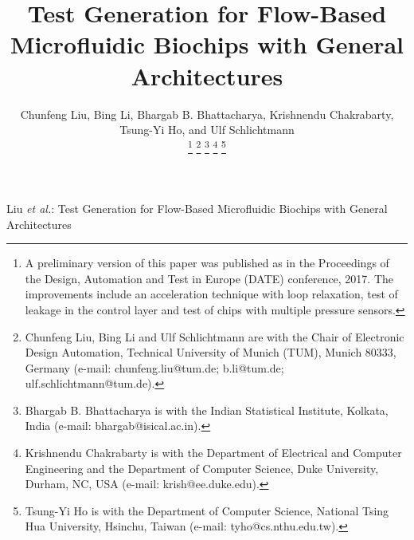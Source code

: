 \documentclass[journal]{IEEEtran}
\begin{document}
\graphicspath{{Fig/}}
\def\figname{Fig.}
\def\algname{Algorithm}
\newcommand{\figurefontsize}{\footnotesize}
\newcommand{\papertitle}{Test Generation for Flow-Based Microfluidic
Biochips with General Architectures}
\newcommand{\tum}{Technical University of Munich (TUM)}




\title{\papertitle}

\author{	
Chunfeng Liu, Bing Li, Bhargab B. Bhattacharya, Krishnendu
Chakrabarty, Tsung-Yi Ho, and Ulf Schlichtmann

\thanks{A preliminary version of this paper was published as \cite{CBBK17} in
the Proceedings of the Design, Automation and Test in Europe (DATE)
conference, 2017. The improvements include an acceleration technique with loop
relaxation, test of leakage in the control layer and test of chips with multiple
pressure sensors.}
          \thanks{Chunfeng Liu, Bing Li and Ulf Schlichtmann are with the Chair
	    of Electronic Design Automation,
          \tum, Munich 80333, Germany (e-mail: chunfeng.liu@tum.de; b.li@tum.de;
  ulf.schlichtmann@tum.de).}
          \thanks{Bhargab B. Bhattacharya is with the Indian Statistical Institute, Kolkata, India
   (e-mail: bhargab@isical.ac.in).}
           \thanks{Krishnendu Chakrabarty is with the Department of 
	     Electrical and Computer Engineering and the Department of Computer
	     Science, Duke University, Durham, NC, USA (e-mail: krish@ee.duke.edu).}
            \thanks{Tsung-Yi Ho is with the Department of Computer Science,  
	    National Tsing Hua University, Hsinchu, Taiwan (e-mail: tyho@cs.nthu.edu.tw).}
}

\maketitle
 {Liu \MakeLowercase{\textit{et al.}}: \papertitle}

 
 \IEEEpeerreviewmaketitle

















\clearpage

\end{document}
